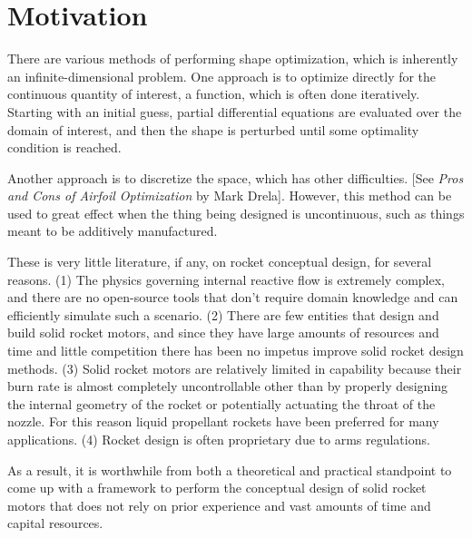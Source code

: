 \section{Motivation}
\label{sec:motivation}
	
There are various methods of performing shape optimization, which is inherently an infinite-dimensional problem.
One approach is to optimize directly for the continuous quantity of interest, a function, which is often done iteratively.
Starting with an initial guess, partial differential equations are evaluated over the domain of interest,
and then the shape is perturbed until some optimality condition is reached.

Another approach is to discretize the space, which has other difficulties.
[See \textit{Pros and Cons of Airfoil Optimization} by Mark Drela].
However, this method can be used to great effect when the thing being designed is
uncontinuous, such as things meant to be additively manufactured.

These is very little literature, if any, on rocket conceptual design,
for several reasons. (1) The physics governing internal reactive flow is extremely complex,
and there are no open-source tools that don't require domain knowledge and
can efficiently simulate such a scenario.
(2) There are few entities that design and build solid rocket motors, and since they have
large amounts of resources and time and little competition there has been no impetus
improve solid rocket design methods. (3) Solid rocket motors are relatively limited
in capability because their burn rate is almost completely uncontrollable other
than by properly designing the internal geometry of the rocket or potentially actuating the
throat of the nozzle. For this reason liquid propellant rockets have been preferred for
many applications. (4) Rocket design is often proprietary due to arms regulations.

As a result, it is worthwhile from both a theoretical and practical standpoint
to come up with a framework to perform the conceptual design of solid rocket
motors that does not rely on prior experience and vast amounts of time and capital resources.
